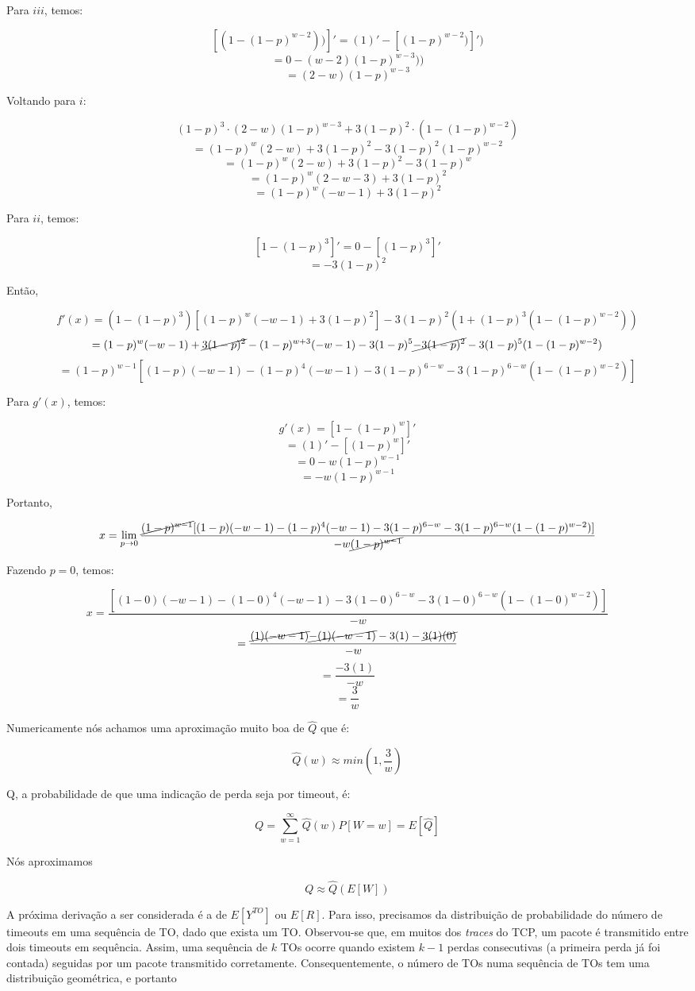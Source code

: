 Para $iii$, temos:

$$[(1 - (1-p)^{w-2}))]' = (1)' - [(1-p)^{w-2})]') $$
$$ = 0 - (w-2)(1-p)^{w-3})) $$
$$ = (2-w)(1-p)^{w-3} $$

Voltando para $i$:

$$ (1-p)^3\cdot (2-w)(1-p)^{w-3} + 3(1-p)^2\cdot (1 - (1-p)^{w-2})$$
$$= (1-p)^w(2-w) + 3(1-p)^2 - 3(1-p)^2(1-p)^{w-2}$$
$$= (1-p)^w(2-w) + 3(1-p)^2 - 3(1-p)^w$$
$$= (1-p)^w(2-w -3) + 3(1-p)^2$$
$$= (1-p)^w(-w -1) + 3(1-p)^2$$

Para $ii$, temos:

$$[1-(1-p)^3]' = 0 - [(1-p)^3]' $$
$$= - 3(1-p)^2 $$

Então, 

$$f'(x) = (1 - (1-p)^3)[(1-p)^w(-w-1) + 3(1-p)^2] - 3(1-p)^2(1+(1-p)^3(1-(1-p)^{w-2})) $$
$$= (1-p)^w(-w-1) + \cancel{3(1-p)^2} - (1-p)^{w+3}(-w-1) - 3(1-p)^5 \cancel{- 3(1-p)^2} - 3(1-p)^5(1-(1-p)^{w-2}) $$
$$= (1-p)^{w-1}[(1-p)(-w-1) - (1-p)^4(-w-1) - 3(1-p)^{6-w} - 3(1-p)^{6-w}(1-(1-p)^{w-2})]$$

Para $g'(x)$, temos:

$$g'(x) = [1 - (1-p)^w]' $$
$$ = (1)' - [(1-p)^w]' $$
$$ = 0 - w(1-p)^{w-1} $$
$$ = - w(1-p)^{w-1} $$

Portanto, 

$$x = \lim_{p \to 0}\frac{\cancel{(1-p)^{w-1}}[(1-p)(-w-1) - (1-p)^4(-w-1) - 3(1-p)^{6-w} - 3(1-p)^{6-w}(1-(1-p)^{w-2})]}{- w\cancel{(1-p)^{w-1}}} $$

Fazendo $p = 0$, temos:

$$x = \frac{[(1-0)(-w-1) - (1-0)^4(-w-1) - 3(1-0)^{6-w} - 3(1-0)^{6-w}(1-(1-0)^{w-2})]}{- w} $$
$$= \frac{\cancel{(1)(-w-1)} \cancel{- (1)(-w-1)} - 3(1) - \cancel{3(1)(0)}}{- w} $$
$$= \frac{- 3(1)}{- w} $$
$$= \frac{3}{w} $$

Numericamente nós achamos uma aproximação muito boa de $\hat{Q}$ que é:

$$\hat{Q}(w) \approx min(1, \frac{3}{w}) $$

Q, a probabilidade de que uma indicação de perda seja por timeout, é:

$$Q = \sum_{w=1}^{\infty}\hat{Q}(w)P[W = w] = E[\hat{Q}]$$

Nós aproximamos 

$$Q \approx \hat{Q}(E[W])$$

A próxima derivação a ser considerada é a de $E[Y^{TO}]$ ou $E[R]$. Para isso, precisamos da distribuição de probabilidade do número de timeouts em uma sequência de TO, dado que exista um TO. Observou-se que, em muitos dos \textit{traces} do TCP, um pacote é transmitido entre dois timeouts em sequência. Assim, uma sequência de $k$ TOs ocorre quando existem $k - 1$ perdas consecutivas (a primeira perda já foi contada) seguidas por um pacote transmitido corretamente. Consequentemente, o número de TOs numa sequência de TOs tem uma distribuição geométrica, e portanto

